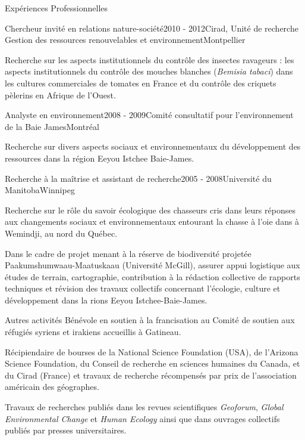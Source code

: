 \documentclass[9pt, letterpage]{resume} %
\begin{document}
\begin{rSection}{Expériences Professionnelles}
\begin{rSubsection}{Chercheur invité en relations nature-société}{2010 - 2012}{Cirad, Unité de recherche Gestion des ressources renouvelables et environnement}{Montpellier}
\item Recherche sur les aspects institutionnels du contrôle des insectes ravageurs : les aspects institutionnels du contrôle des mouches blanches (\emph{Bemisia tabaci}) dans les cultures commerciales de tomates en France et du contrôle des criquets pèlerins en Afrique de l'Ouest.
\end{rSubsection}

\begin{rSubsection}{Analyste en environnement}{2008 - 2009}{Comité consultatif pour l’environnement de la Baie James}{Montréal}
\item Recherche sur divers aspects sociaux et environnementaux du développement des ressources dans la région Eeyou Istchee Baie-James.
\end{rSubsection}

\begin{rSubsection}{Recherche à la maîtrise et assistant de recherche}{2005 - 2008}{Université du Manitoba}{Winnipeg}

\item Recherche sur le rôle du savoir écologique des chasseurs cris dans leurs réponses aux changements sociaux et environnementaux entourant la chasse à l’oie dans à Wemindji, au nord du Québec.

\item Dans le cadre de projet menant à la réserve de biodiversité projetée Paakumshumwaau-Maatuskaau (Université McGill), assurer appui logistique aux études de terrain, cartographie, contribution à la rédaction collective de rapports techniques et révision des travaux collectifs concernant l’écologie, culture et développement dans la rions Eeyou Istchee-Baie-James.
\end{rSubsection}
\end{rSection}

\begin{rSection}{Autres activités} 
Bénévole en soutien à la francisation au Comité de soutien aux réfugiés syriens et irakiens accueillis à Gatineau. 

Récipiendaire de bourses de la National Science Foundation (USA), de l'Arizona Science Foundation, du Conseil de recherche en sciences humaines du Canada, et du Cirad (France) et travaux de recherche récompensés par prix de l'association américain des géographes. 

Travaux de recherches publiés dans les revues scientifiques \emph{Geoforum}, \emph{Global Environmental Change} et \emph{Human Ecology} ainsi que dans ouvrages collectifs publiés par presses universitaires. 




\end{rSection}
\end{document}
